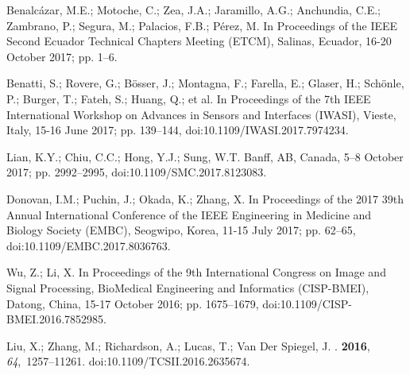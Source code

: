 \documentclass[sensors,review,accept,moreauthors,pdftex]{Definitions/mdpi}
\begin{document}
\begin{thebibliography}{999}
Benalc{\'a}zar, M.E.; Motoche, C.; Zea, J.A.; Jaramillo, A.G.; Anchundia, C.E.;
  Zambrano, P.; Segura, M.; Palacios, F.B.; P{\'e}rez, M.
 {In {Proceedings of the IEEE Second Ecuador Technical Chapters Meeting (ETCM),} Salinas, Ecuador, 16-20 October 2017;}
\newblock pp. 1--6.

Benatti, S.; Rovere, G.; B{\"o}sser, J.; Montagna, F.; Farella, E.; Glaser, H.;
  Sch{\"o}nle, P.; Burger, T.; Fateh, S.; Huang, Q.; et al.
 { In {Proceedings of the 7th IEEE International Workshop on Advances in Sensors and Interfaces (IWASI), } Vieste, Italy, 15-16 June 2017};
\newblock pp. 139--144, doi:10.1109/IWASI.2017.7974234.

Lian, K.Y.; Chiu, C.C.; Hong, Y.J.; Sung, W.T.
 {Banff, AB, Canada, 5--8 October 2017};
\newblock pp. 2992--2995, doi:10.1109/SMC.2017.8123083.

Donovan, I.M.; Puchin, J.; Okada, K.; Zhang, X.
 {In {Proceedings of the  2017 39th Annual International Conference of the IEEE Engineering in Medicine and Biology Society (EMBC),} Seogwipo, Korea, 11-15 July 2017};
\newblock pp. 62--65, doi:10.1109/EMBC.2017.8036763.

Wu, Z.; Li, X.
  {In {Proceedings of the 9th International Congress on Image and Signal Processing, BioMedical Engineering and Informatics (CISP-BMEI),} Datong, China, 15-17 October 2016};
\newblock pp. 1675--1679, doi:10.1109/CISP-BMEI.2016.7852985.

Liu, X.; Zhang, M.; Richardson, A.; Lucas, T.; {Van Der Spiegel}, J.
.
 {\bf 2016}, {\em 64},~1257--11261. doi:10.1109/TCSII.2016.2635674.


\end{thebibliography}
\end{document}
